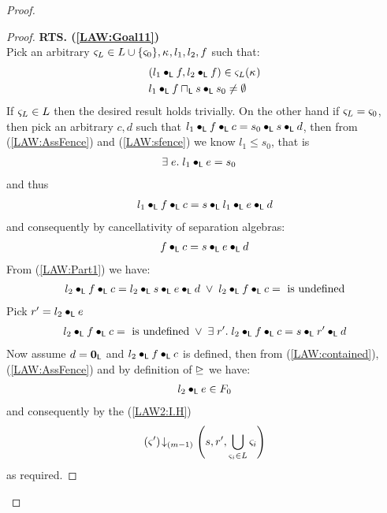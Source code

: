 \begin{lemma}[]
\begin{proof}
\begin{proof}
\noindent\textbf{RTS. (\ref{LAW:Goal11})}\\
Pick an arbitrary $\varsigma_{L} \in L \cup \{\varsigma_{0}\}, \kappa_{}, l_1, l_2, f$ such that:
%
\begin{align}
	& (l_1 \bullet_{\textsf{L}} f, l_2 \bullet_{\textsf{L}} f) \in \varsigma_{L}(\kappa_{}) \label{LAW:Ass16}\\
	& l_1 \bullet_{\textsf{L}} f \sqcap_{\textsf{L}} s \bullet_{\textsf{L}} s_0 \not= \emptyset \label{LAW:Ass17}\\
\end{align}
%
If $\varsigma_{L} \in L$ then the desired result holds trivially. On the other hand if $\varsigma_{L} = \varsigma_{0}$, then pick an arbitrary $c, d$ such that $l_1 \bullet_{\textsf{L}} f \bullet_{\textsf{L}} c = s_0 \bullet_{\textsf{L}} s \bullet_{\textsf{L}} d$, then from (\ref{LAW:AssFence}) and (\ref{LAW:sfence}) we know $l_1 \leq s_0$, that is 
%
\begin{align}
	& \exists\; e.\; l_1 \bullet_{\textsf{L}} e = s_0 \label{LAW:contained}
\end{align}
%
and thus
%
\begin{align}
	l_1 \bullet_{\textsf{L}} f \bullet_{\textsf{L}} c = s \bullet_{\textsf{L}} l_1 \bullet_{\textsf{L}} e \bullet_{\textsf{L}} d \nonumber
\end{align}
%
and consequently by cancellativity of separation algebras:
%
\begin{align}
	f \bullet_{\textsf{L}} c = s \bullet_{\textsf{L}} e \bullet_{\textsf{L}} d \label{LAW:Part1}
\end{align}
%
From (\ref{LAW:Part1}) we have:
%
\begin{align}
	l_2 \bullet_{\textsf{L}} f \bullet_{\textsf{L}} c = l_2 \bullet_{\textsf{L}} s \bullet_{\textsf{L}} e \bullet_{\textsf{L}} d \;\lor\; l_2 \bullet_{\textsf{L}} f \bullet_{\textsf{L}} c = \text{ is undefined} \nonumber
\end{align}
%
Pick $r' = l_2 \bullet_{\textsf{L}} e$
%
\begin{align}
	l_2 \bullet_{\textsf{L}} f \bullet_{\textsf{L}} c = \text{ is undefined} \;\lor\; \exists\; r'.\; l_2 \bullet_{\textsf{L}} f \bullet_{\textsf{L}} c = s \bullet_{\textsf{L}} r' \bullet_{\textsf{L}} d \label{LAW:Part2}
\end{align}
%
Now assume $d = \mathbf{0}_{\textsf{L}}$ and $l_2 \bullet_{\textsf{L}} f \bullet_{\textsf{L}} c$ is defined, then from (\ref{LAW:contained}), (\ref{LAW:AssFence}) and by definition of $\unrhd$ we have:
%
\begin{align}
	l_2 \bullet_{\textsf{L}} e \in F_0 \label{LAW:fenced}
\end{align}
%
and consequently by the (\ref{LAW2:I.H})
%
\begin{align}
	\left(\varsigma_{}'\right) \!\downarrow_{(m-1)} \left(s, r', \bigcup\limits_{\varsigma_{i} \in L}\varsigma_{i}\right)
\end{align}
as required.
\renewcommand{\qed}{}
\end{proof}



\end{proof}
\end{lemma}
